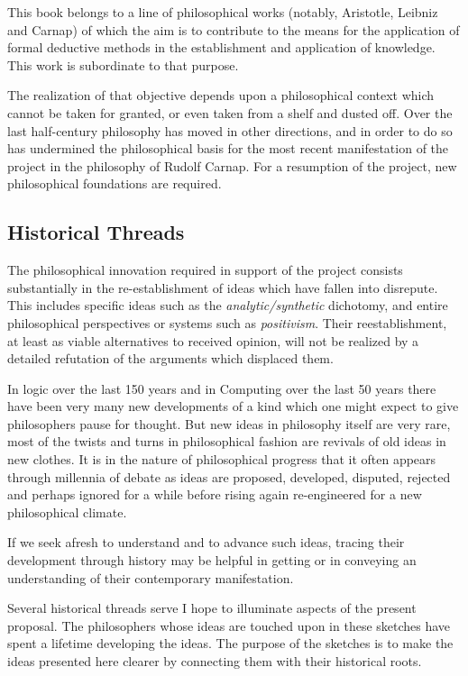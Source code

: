 This book belongs to a line of philosophical works (notably,
Aristotle, Leibniz and Carnap) of which the aim is
to contribute to the means for the application of formal deductive
methods in the establishment and application of knowledge.
This work is subordinate to that purpose.

The realization of that objective depends upon a philosophical
context which cannot be taken for granted, or even taken from a shelf
and dusted off.
Over the last half-century philosophy has moved in other directions,
and in order to do so has undermined the philosophical basis for the
most recent manifestation of the project in the philosophy of Rudolf
Carnap.
For a resumption of the project, new philosophical foundations are
required.

\subsection{Historical Threads}

The philosophical innovation required in support of the project
consists substantially in the re-establishment of ideas which have
fallen into disrepute.
This includes specific ideas such as the \emph{analytic/synthetic}
dichotomy, and entire philosophical perspectives or systems such as
\emph{positivism}.
Their reestablishment, at least as viable alternatives to received
opinion, will not be realized by a detailed refutation of the
arguments which displaced them.


In logic over the last 150 years and in Computing over the last 50
years there have been very many new developments of a kind which one
might expect to give philosophers pause for thought.
But new ideas in philosophy itself are very rare, most of the twists
and turns in philosophical fashion are revivals of old ideas in new
clothes.
It is in the nature of philosophical progress that it often appears
through millennia of debate as ideas are proposed, developed, disputed,
rejected and perhaps ignored for a while before rising again
re-engineered for a new philosophical climate.

If we seek afresh to understand and to advance such ideas, tracing
their development through history may be helpful in getting or in
conveying an understanding of their contemporary manifestation.

Several historical threads serve I hope to illuminate aspects of the
present proposal.
The philosophers whose ideas are touched upon in these sketches have
spent a lifetime developing the ideas.
The purpose of the sketches is to make the ideas presented here
clearer by connecting them with their historical roots.

